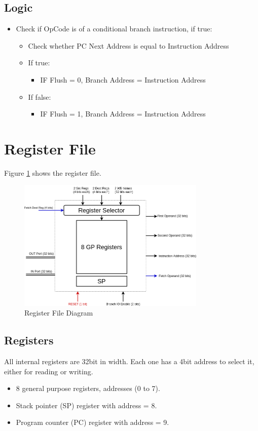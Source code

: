 \subsection{Logic}
\begin{itemize}
    \item Check if OpCode is of a conditional branch instruction, if true:
    \begin{itemize}
        \item Check whether PC Next Address is equal to Instruction Address
        \item If true:
        \begin{itemize}
            \item IF Flush = 0, Branch Address = Instruction Address
        \end{itemize}
        \item If false:
        \begin{itemize}
            \item IF Flush = 1, Branch Address = Instruction Address
        \end{itemize}
    \end{itemize}
\end{itemize}

\section{Register File}
Figure \ref{fig:reg_file} shows the register file.
\begin{figure}[hp]
    \centering
    \includegraphics[width=0.8\textwidth]{images/reg_file.png}
    \caption{Register File Diagram}
    \label{fig:reg_file}
\end{figure}

\subsection{Registers}
All internal registers are 32bit in width. Each one has a 4bit address to select it, either for reading or writing.
\begin{itemize}
    \item 8 general purpose registers, addresses (0 to 7).
    \item Stack pointer (SP) register with address = 8.
    \item Program counter (PC) register with address = 9.
\end{itemize}

